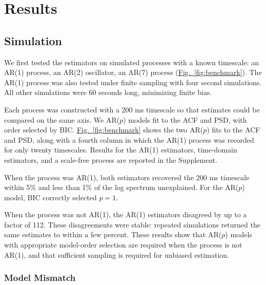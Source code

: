 \documentclass[pdflatex,lineno,sn-nature]{sn-jnl}
\newcommand{\figpanel}[3][]{\hyperref[#2]{Fig.~#1\ref*{#2}#3}}
\theoremstyle{thmstyleone}
\theoremstyle{thmstyletwo}
\theoremstyle{thmstylethree}
\begin{document}
\section{Results}\label{sec:results}

\subsection{Simulation}\label{sec:sim}

We first tested the estimators on simulated processes with a known timescale: an AR(1) process, an AR(2) oscillator, an AR(7) process (\figpanel{fig:benchmark}{}). The AR(1) process was also tested under finite sampling with four second simulations. All other simulations were 60 seconds long, minimizing finite bias.

Each process was constructed with a 200 ms timescale so that estimates could be compared on the same axis. We AR($p$) models fit to the ACF and PSD, with order selected by BIC. \figpanel{fig:benchmark}{} shows the two AR($p$) fits to the ACF and PSD, along with a fourth column in which the AR(1) process was recorded for only twenty timescales. Results for the AR(1) estimators, time-domain estimators, and a scale-free process are reported in the Supplement.

When the process was AR(1), both estimators recovered the 200 ms timescale within 5\% and less than 1\% of the log spectrum unexplained. For the AR($p$) model, BIC correctly selected $p = 1$.

When the process was not AR(1), the AR(1) estimators disagreed by up to a factor of 112. These disagreements were stable: repeated simulations returned the same estimates to within a few percent. These results show that AR($p$) models with appropriate model-order selection are required when the process is not AR(1), and that sufficient sampling is required for unbiased estimation.

\subsubsection{Model Mismatch}\label{sec:modes}
\end{document}
